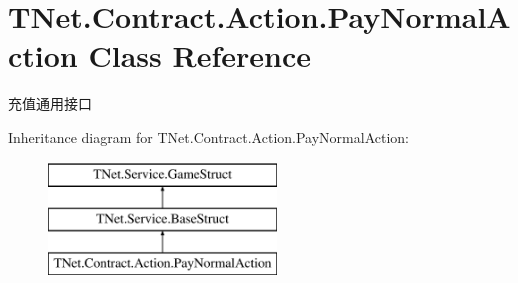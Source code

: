 \hypertarget{class_t_net_1_1_contract_1_1_action_1_1_pay_normal_action}{}\section{T\+Net.\+Contract.\+Action.\+Pay\+Normal\+Action Class Reference}
\label{class_t_net_1_1_contract_1_1_action_1_1_pay_normal_action}


充值通用接口  


Inheritance diagram for T\+Net.\+Contract.\+Action.\+Pay\+Normal\+Action\+:\begin{figure}[H]
\begin{center}
\leavevmode
\includegraphics[height=3.000000cm]{class_t_net_1_1_contract_1_1_action_1_1_pay_normal_action}
\end{center}
\end{figure}
